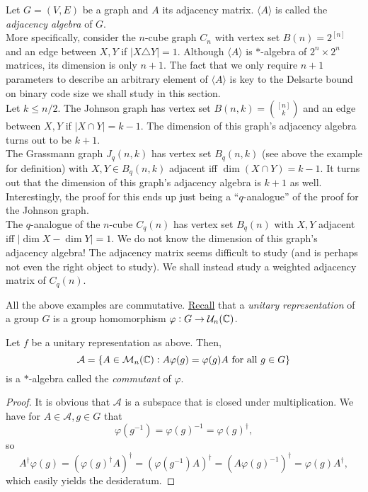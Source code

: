 	\begin{fex}
		\label{exmp: star-alg}
		Let $G = (V,E)$ be a graph and $A$ its adjacency matrix. $\langle A\rangle$ is called the \emph{adjacency algebra} of $G$. \\

		More specifically, consider the $n$-cube graph $C_n$ with vertex set $B(n)=2^{[n]}$ and an edge between $X,Y$ if $|X \triangle Y| = 1$. Although $\langle A\rangle$ is $*$-algebra of $2^n \times 2^n$ matrices, its dimension is only $n+1$. The fact that we only require $n+1$ parameters to describe an arbitrary element of $\langle A\rangle$ is key to the Delsarte bound on binary code size we shall study in this section.\\

		Let $k \le n/2$. The Johnson graph has vertex set $B(n,k) = \binom{[n]}{k}$ and an edge between $X,Y$ if $|X \cap Y| = k-1$. The dimension of this graph's adjacency algebra turns out to be $k+1$.\\

		The Grassmann graph $J_q(n,k)$ has vertex set $B_q(n,k)$ (see above the example for definition) with $X,Y \in B_q(n,k)$ adjacent iff $\dim(X \cap Y) = k-1$. It turns out that the dimension of this graph's adjacency algebra is $k+1$ as well. Interestingly, the proof for this ends up just being a ``$q$-analogue'' of the proof for the Johnson graph.\\

		The $q$-analogue of the $n$-cube $C_q(n)$ has vertex set $B_q(n)$ with $X,Y$ adjacent iff $|\dim X - \dim Y| = 1$. We do not know the dimension of this graph's adjacency algebra! The adjacency matrix seems difficult to study (and is perhaps not even the right object to study). We shall instead study a weighted adjacency matrix of $C_q(n)$.
	\end{fex}

	All the above examples are commutative. \href{https://amitrajaraman.github.io/notes/rep-th/main.pdf}{Recall} that a \emph{unitary representation} of a group $G$ is a group homomorphism $\varphi : G \to \mathcal{U}_n(\mathbb{C})$.

	\begin{ftheo}
		Let $f$ be a unitary representation as above. Then,
		\[ \mathcal{A} = \{A \in \mathcal{M}_n(\mathbb{C}) : A \varphi(g) = \varphi(g) A \text{ for all } g \in G \} \]
		is a $*$-algebra called the \emph{commutant} of $\varphi$.
	\end{ftheo}
	\begin{proof}
		It is obvious that $\mathcal{A}$ is a subspace that is closed under multiplication. We have for $A \in \mathcal{A}, g \in G$ that
		\[ \varphi(g^{-1}) = \varphi(g)^{-1} = \varphi(g)^\dagger, \]
		so
		\[ A^\dagger \varphi(g) = (\varphi(g)^\dagger A)^\dagger = (\varphi(g^{-1}) A)^\dagger = (A \varphi(g)^{-1})^\dagger = \varphi(g) A^\dagger, \]
		which easily yields the desideratum.
	\end{proof}

